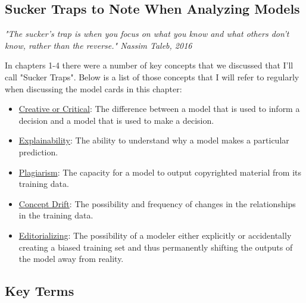 \subsection{Sucker Traps to Note When Analyzing Models}

\textit{"The sucker's trap is when you focus on what you know and what others don't know, rather than the reverse." Nassim Taleb, 2016}\cite{procrustes}

In chapters 1-4 there were a number of key concepts that we discussed that I'll call "Sucker Traps". Below is a list of those concepts that I will refer to regularly when discussing the model cards in this chapter:

\begin{itemize}
    \item \hyperref[sec:creative]{Creative or Critical}: The difference between a model that is used to inform a decision and a model that is used to make a decision.
    \item \hyperref[sec:explain]{Explainability}: The ability to understand why a model makes a particular prediction.
    \item \hyperref[sec:plag]{Plagiarism}: The capacity for a model to output copyrighted material from its training data.
    \item \hyperref[sec:drift]{Concept Drift}: The possibility and frequency of changes in the relationships in the training data.
    \item \hyperref[sec:janitor]{Editorializing}: The possibility of a modeler either explicitly or accidentally creating a biased training set and thus permanently shifting the outputs of the model away from reality.
\end{itemize}

\subsection{Key Terms}

